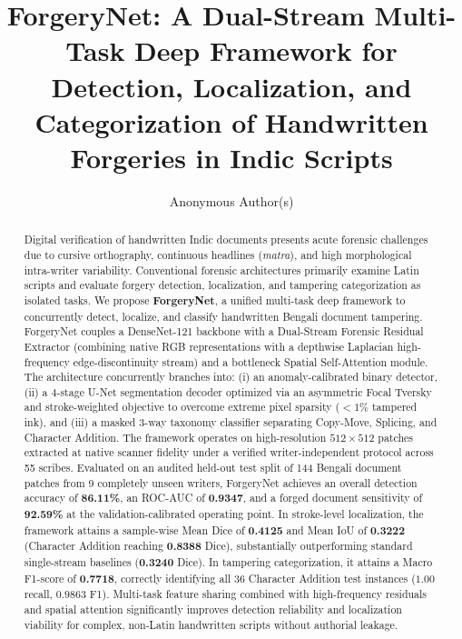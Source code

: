 \documentclass[runningheads]{llncs}
\begin{document}
\title{ForgeryNet: A Dual-Stream Multi-Task Deep Framework for Detection, Localization, and Categorization of Handwritten Forgeries in Indic Scripts}


\author{Anonymous Author(s)}

\maketitle

\begin{abstract}
Digital verification of handwritten Indic documents presents acute forensic challenges due to cursive orthography, continuous headlines (\textit{matra}), and high morphological intra-writer variability. Conventional forensic architectures primarily examine Latin scripts and evaluate forgery detection, localization, and tampering categorization as isolated tasks. We propose \textbf{ForgeryNet}, a unified multi-task deep framework to concurrently detect, localize, and classify handwritten Bengali document tampering. ForgeryNet couples a DenseNet-121 backbone with a Dual-Stream Forensic Residual Extractor (combining native RGB representations with a depthwise Laplacian high-frequency edge-discontinuity stream) and a bottleneck Spatial Self-Attention module. The architecture concurrently branches into: (i) an anomaly-calibrated binary detector, (ii) a 4-stage U-Net segmentation decoder optimized via an asymmetric Focal Tversky and stroke-weighted objective to overcome extreme pixel sparsity ($<1\%$ tampered ink), and (iii) a masked 3-way taxonomy classifier separating Copy-Move, Splicing, and Character Addition. The framework operates on high-resolution $512 \times 512$ patches extracted at native scanner fidelity under a verified writer-independent protocol across 55 scribes. Evaluated on an audited held-out test split of 144 Bengali document patches from 9 completely unseen writers, ForgeryNet achieves an overall detection accuracy of \textbf{86.11\%}, an ROC-AUC of \textbf{0.9347}, and a forged document sensitivity of \textbf{92.59\%} at the validation-calibrated operating point. In stroke-level localization, the framework attains a sample-wise Mean Dice of \textbf{0.4125} and Mean IoU of \textbf{0.3222} (Character Addition reaching \textbf{0.8388} Dice), substantially outperforming standard single-stream baselines (\textbf{0.3240} Dice). In tampering categorization, it attains a Macro F1-score of \textbf{0.7718}, correctly identifying all 36 Character Addition test instances ($1.00$ recall, $0.9863$ F1). Multi-task feature sharing combined with high-frequency residuals and spatial attention significantly improves detection reliability and localization viability for complex, non-Latin handwritten scripts without authorial leakage.


\end{abstract}
\end{document}

